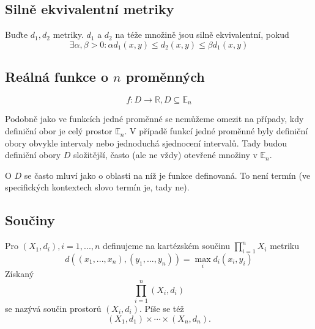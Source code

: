\documentclass[../main.tex]{subfiles}
\begin{document}
\subsection{Silně ekvivalentní metriky}

\begin{definition}
	Buďte $d_1, d_2$ metriky. $d_1$ a $d_2$ na téže množině jsou silně ekvivalentní, pokud
	\[\exists \alpha , \beta > 0: \alpha d_1(x,y) \leq d_2(x,y) \leq \beta d_1(x,y)\]
\end{definition}

\subsection{Reálná funkce o $n$ proměnných}
\[f: D \rightarrow \mathbb{R}, D \subseteq \mathbb{E}_n\]

Podobně jako ve funkcích jedné proměnné se nemůžeme omezit na případy, kdy definiční obor je celý prostor $\mathbb{E}_n$.  
V případě funkcí jedné proměnné byly definiční obory obvykle intervaly nebo jednoduchá sjednocení intervalů. Tady budou definiční
obory $D$ složitější, často (ale ne vždy) otevřené množiny v $\mathbb{E}_n$.

O $D$ se často mluví jako o oblasti na níž je funkce definovaná. To není termín (ve specifických kontextech slovo  termín 
je, tady ne).

\subsection{Součiny}

\begin{definition}[Součin]
	Pro $(X_1,d_i), i = 1,...,n$ definujeme na kartézském součinu $\prod^n_{i=1}X_i$ metriku
	\[d((x_1,...,x_n),(y_1,...,y_n)) = \max_i d_i(x_i,y_i)\]
	Získaný
	\[\prod^n_{i=1}(X_i,d_i)\]
	se nazývá součin prostorů $(X_i, d_i)$. Píše se též 
	\[(X_1,d_1) \times \cdots \times (X_n,d_n).\]
\end{definition}

\end{document}
